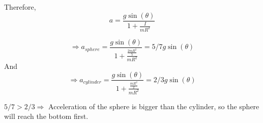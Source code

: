 \documentclass{article}
\begin{document}
Therefore,
\begin{equation*}
  a = \frac{g\sin(\theta)}{1 + \frac{I}{mR^2}}
\end{equation*}

\begin{equation*}
  \Rightarrow a_{sphere} = \frac{g\sin(\theta)}{1 + \frac{\frac{2mR^2}{5}}{mR^2}} = 5/7g\sin(\theta)
\end{equation*}
And
\begin{equation*}
  \Rightarrow a_{cylinder} = \frac{g\sin(\theta)}{1 + \frac{\frac{mR^2}{2}}{mR^2}} = 2/3g\sin(\theta)
\end{equation*}

$5/7 > 2/3 \Rightarrow$ Acceleration of the sphere is bigger than the cylinder, so the sphere will reach the bottom first. 
\end{document}
